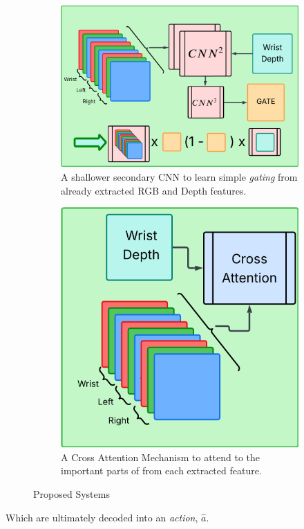 \begin{figure}[htpb]
\begin{subfigure}{0.45\linewidth}
  \end{subfigure}
  \vspace{0.5cm}
  \begin{subfigure}{0.45\linewidth}
    \centering
    \includegraphics[width=0.7\linewidth]{assets/cam-comb/policies/wlr_d-gated-diagram.png}
    \caption{A shallower secondary CNN to learn simple \emph{gating} from already extracted RGB and Depth features.}\label{subfig:policies-wrl_d-gated}
  \end{subfigure}
  \hfill
  \begin{subfigure}{0.45\linewidth}
    \centering
    \includegraphics[width=0.7\linewidth]{assets/cam-comb/policies/wlr_d-attn-diagram.png}
    \caption{A Cross Attention Mechanism to attend to the important parts of from each extracted feature.}\label{subfig:policies-wrl_d-attn}
  \end{subfigure}
  \caption{Proposed Systems}\label{fig:policies-sep-dep-diagrams}
\end{figure}
Which are ultimately decoded into an \emph{action}, $\hat{a}$.

